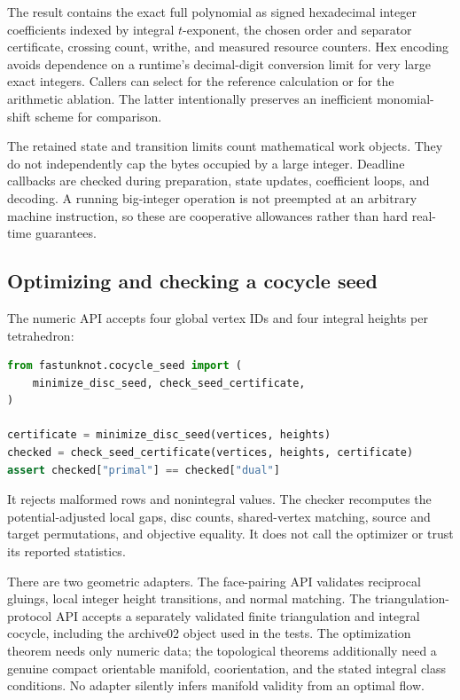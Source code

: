 The result contains the exact full polynomial as signed hexadecimal integer
coefficients indexed by integral $t$-exponent, the chosen order and separator
certificate, crossing count, writhe, and measured resource counters. Hex
encoding avoids dependence on a runtime's decimal-digit conversion limit
for very large exact integers. Callers can select  for the
reference calculation or  for the arithmetic
ablation. The latter intentionally preserves an inefficient monomial-shift
scheme for comparison.

The retained state and transition limits count mathematical work objects.
They do not independently cap the bytes occupied by a large integer.
Deadline callbacks are checked during preparation, state updates,
coefficient loops, and decoding. A running big-integer operation is not
preempted at an arbitrary machine instruction, so these are cooperative
allowances rather than hard real-time guarantees.

\subsection{Optimizing and checking a cocycle seed}

The numeric API accepts four global vertex IDs and four integral heights
per tetrahedron:
\par\noindent\begin{minipage}{\linewidth}
\begin{lstlisting}[language=Python]
from fastunknot.cocycle_seed import (
    minimize_disc_seed, check_seed_certificate,
)

certificate = minimize_disc_seed(vertices, heights)
checked = check_seed_certificate(vertices, heights, certificate)
assert checked["primal"] == checked["dual"]
\end{lstlisting}
\end{minipage}\par

It rejects malformed rows and nonintegral values. The checker recomputes
the potential-adjusted local gaps, disc counts, shared-vertex matching,
source and target permutations, and objective equality. It does not call
the optimizer or trust its reported statistics.

There are two geometric adapters. The face-pairing API validates reciprocal
gluings, local integer height transitions, and normal matching. The
triangulation-protocol API accepts a separately validated finite
triangulation and integral cocycle, including the archive02 object used in
the tests. The optimization theorem needs only numeric data; the topological
theorems additionally need a genuine compact orientable manifold,
coorientation, and the stated integral class conditions. No adapter silently
infers manifold validity from an optimal flow.

